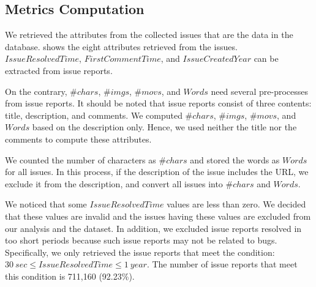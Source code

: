 \subsection{Metrics Computation}

We retrieved the attributes from the collected issues 
that are the data in the database.  shows the eight attributes 
retrieved from the issues. 
$IssueResolvedTime$, $FirstCommentTime$,
and $IssueCreatedYear$ can be extracted from issue reports. 

On the contrary, $\#chars$, $\#imgs$, $\#movs$, and $Words$ need several pre-processes from issue reports. 
It should be noted that issue reports consist of three contents: 
title, description, and comments. 
We computed $\#chars$, $\#imgs$, $\#movs$, and $Words$ based on the description only. 
Hence, we used neither the title nor the comments 
to compute these attributes.


We counted the number of characters as $\#chars$ and 
stored the words as $Words$ for all issues. 
In this process, if the description of the issue 
includes the URL, we exclude it from the description, 
and convert all issues into $\#chars$ and $Words$.

We noticed that some $IssueResolvedTime$ values are less than zero. 
We decided that these values are invalid and the issues having 
these values are excluded from our analysis and the dataset. 
In addition, we excluded issue reports resolved in 
too short periods because such issue reports may not 
be related to bugs. 
Specifically, we only retrieved the issue reports that meet 
the condition: $30\ sec \leq IssueResolvedTime \leq 1\ year$.
The number of issue reports that meet this condition is 711,160 (92.23\%).